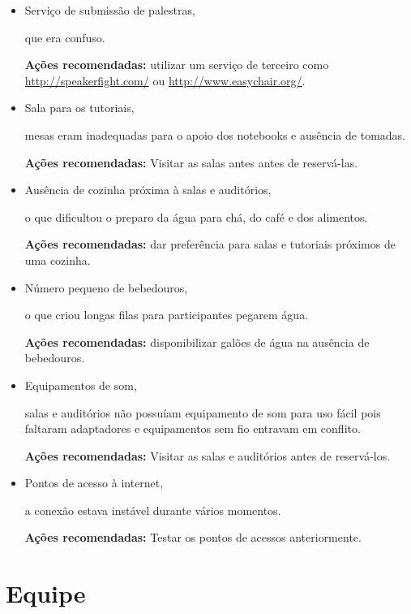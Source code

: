 \documentclass[12pt]{article}
\begin{document}
\begin{itemize}
  \item Serviço de submissão de palestras,

    que era confuso.

    \textbf{Ações recomendadas:} utilizar um serviço de terceiro como
    \url{http://speakerfight.com/} ou \url{http://www.easychair.org/}.

  \item Sala para os tutoriais,

    mesas eram inadequadas para o apoio dos notebooks e ausência de tomadas.

    \textbf{Ações recomendadas:} Visitar as salas antes antes de reservá-las.

  \item Ausência de cozinha próxima à salas e auditórios,

    o que dificultou o preparo da água para chá, do café e dos alimentos.

    \textbf{Ações recomendadas:} dar preferência para salas e tutoriais próximos
    de uma cozinha.

  \item Número pequeno de bebedouros,

    o que criou longas filas para participantes pegarem água.

    \textbf{Ações recomendadas:} disponibilizar galões de água na ausência de
    bebedouros.

  \item Equipamentos de som,

    salas e auditórios não possuíam equipamento de som para uso fácil pois
    faltaram adaptadores e equipamentos sem fio entravam em conflito.

    \textbf{Ações recomendadas:} Visitar as salas e auditórios antes de
    reservá-los.

  \item Pontos de acesso à internet,

    a conexão estava instável durante vários momentos.

    \textbf{Ações recomendadas:} Testar os pontos de acessos anteriormente.

\end{itemize}

\newpage

\section*{Equipe}
\end{document}
